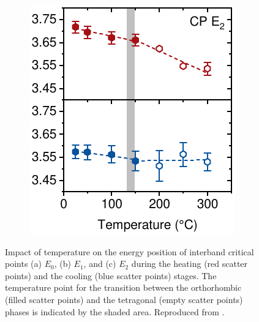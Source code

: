 \begin{figure}[ht!]
\begin{subfigure}{0.31\textwidth}
        \caption{}
        \label{fig:ellipsometry:CP1}
    \end{subfigure}
    \hfill
    \begin{subfigure}{0.31\textwidth}
        \includegraphics[width=\textwidth]{chapters/ellipsometry/image/CP3}
        \caption{}
        \label{fig:ellipsometry:deriv:CP2}
    \end{subfigure}
    \caption[Impact of temperature on the energy position of interband critical points during the heating and cooling stages.]{Impact of temperature on the energy position of interband critical points (a) $E_0$, (b) $E_1$, and (c) $E_2$ during the heating (red scatter points) and the cooling (blue scatter points) stages. The temperature point for the transition between the orthorhombic (filled scatter points) and the tetragonal (empty scatter points) phases is indicated by the shaded area. Reproduced from \cite{Papadopoulou2024InEllipsometry}.}
    \label{fig:ellipsometry:CP_all}
\end{figure}


